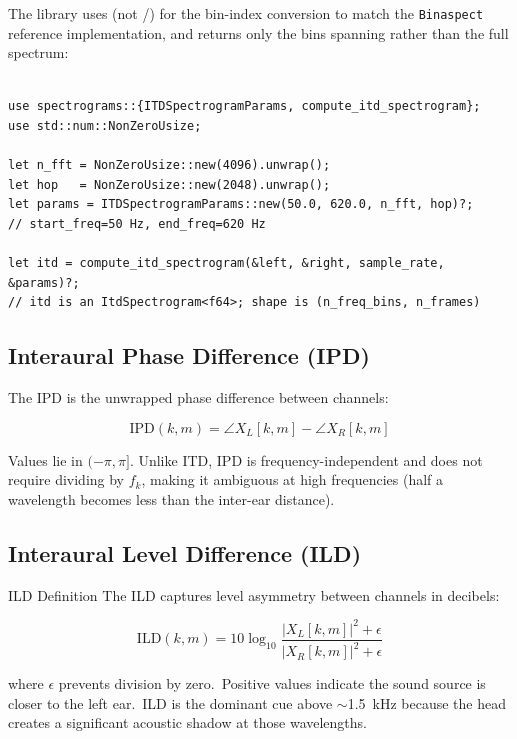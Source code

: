 The library uses  (not /) for the
bin-index conversion to match the \texttt{Binaspect} reference
implementation, and returns only the bins spanning
 rather than the full spectrum:

\begin{lstlisting}[caption={Computing ITD spectrogram from stereo channels}]

use spectrograms::{ITDSpectrogramParams, compute_itd_spectrogram};
use std::num::NonZeroUsize;

let n_fft = NonZeroUsize::new(4096).unwrap();
let hop   = NonZeroUsize::new(2048).unwrap();
let params = ITDSpectrogramParams::new(50.0, 620.0, n_fft, hop)?;
// start_freq=50 Hz, end_freq=620 Hz

let itd = compute_itd_spectrogram(&left, &right, sample_rate, &params)?;
// itd is an ItdSpectrogram<f64>; shape is (n_freq_bins, n_frames)
\end{lstlisting}

\subsection{Interaural Phase Difference (IPD)}\label{subsec:ipd}

The IPD is the unwrapped phase difference between channels:

\begin{equation}
  \text{IPD}(k, m) = \angle X_L[k,m] - \angle X_R[k,m]
\end{equation}

Values lie in $(-\pi, \pi]$. Unlike ITD, IPD is frequency-independent
and does not require dividing by $f_k$, making it ambiguous at high
frequencies (half a wavelength becomes less than the inter-ear distance).

\subsection{Interaural Level Difference (ILD)}\label{subsec:ild}

\begin{concept}{ILD Definition}
  The ILD captures level asymmetry between channels in decibels:

  \begin{equation}
    \label{eq:ild}
    \text{ILD}(k, m) = 10 \log_{10}
    \frac{|X_L[k,m]|^2 + \epsilon}{|X_R[k,m]|^2 + \epsilon}
  \end{equation}

  where $\epsilon$ prevents division by zero.\ Positive values indicate
  the sound source is closer to the left ear.\ ILD is the dominant
  cue above $\sim$1.5~kHz because the head creates a significant
  acoustic shadow at those wavelengths.
\end{concept}

